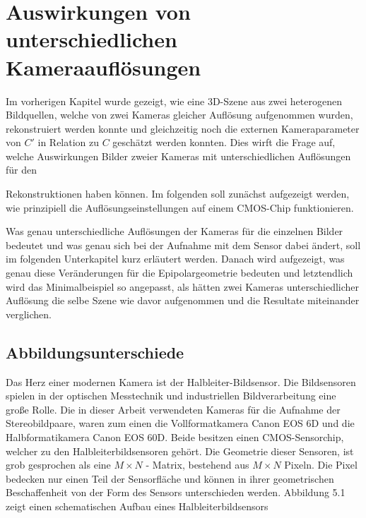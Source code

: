 \chapter{Auswirkungen von unterschiedlichen Kameraauflösungen}
\label{sec:minimalAuf} 


Im vorherigen Kapitel wurde gezeigt, wie eine 3D-Szene aus zwei heterogenen Bildquellen, welche von zwei Kameras gleicher Auflösung aufgenommen wurden, rekonstruiert werden konnte und gleichzeitig noch die externen Kameraparameter von $C'$ in Relation zu $C$ geschätzt werden konnten. Dies wirft die Frage auf, welche Auswirkungen Bilder zweier Kameras mit unterschiedlichen Auflösungen für den 

 Rekonstruktionen haben können. Im folgenden soll zunächst aufgezeigt werden, wie prinzipiell die Auflösungseinstellungen auf einem CMOS-Chip funktionieren.


 Was genau unterschiedliche Auflösungen der Kameras für die einzelnen Bilder bedeutet und was genau sich bei der Aufnahme mit dem Sensor dabei ändert, soll im folgenden Unterkapitel kurz erläutert werden. Danach wird aufgezeigt, was genau diese Veränderungen für die Epipolargeometrie bedeuten und letztendlich wird das Minimalbeispiel so angepasst, als hätten zwei Kameras unterschiedlicher Auflösung die selbe Szene wie davor aufgenommen und die Resultate miteinander verglichen. 

\section{Abbildungsunterschiede}



Das Herz einer modernen Kamera ist der Halbleiter-Bildsensor. Die Bildsensoren spielen in der optischen Messtechnik und industriellen Bildverarbeitung eine große Rolle\cite{Photonik}. Die in dieser Arbeit verwendeten Kameras für die Aufnahme der Stereobildpaare, waren zum einen die Vollformatkamera Canon EOS 6D und die Halbformatikamera Canon EOS 60D. Beide besitzen einen CMOS-Sensorchip, welcher zu den Halbleiterbildsensoren gehört\cite{Canon6D}. Die Geometrie dieser Sensoren, ist grob gesprochen als eine $M \times N$ - Matrix, bestehend aus $M \times N$ Pixeln. Die Pixel bedecken nur einen Teil der Sensorfläche und können in ihrer geometrischen Beschaffenheit von der Form des Sensors unterschieden werden\cite{Photonik}. Abbildung 5.1 zeigt einen schematischen Aufbau eines Halbleiterbildsensors\\

